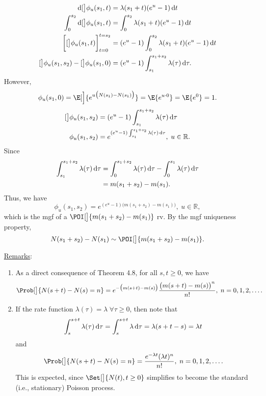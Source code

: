 \begin{Result}
\begin{align*}
        \odif{\ln[\big]{\phi_u(s_1,t)}}                      & =\lambda(s_1+t)(e^u-1)\odif{t}                         \\
        \int_{0}^{s_2}\odif{\ln[\big]{\phi_u(s_1,t)}}        & =\int_{0}^{s_2}\lambda(s_1+t)(e^u-1)\odif{t}           \\
        \biggl[\ln[\big]{\phi_u(s_1,t)}\biggr]_{t=0}^{t=s_2} & =(e^u-1)\int_{0}^{s_2}\lambda(s_1+t)(e^u-1)\odif{t}    \\
        \ln[\big]{\phi_u(s_1,s_2)}-\ln[\big]{\phi_u(s_1,0)}  & =(e^u-1)\int_{s_1}^{s_1+s_2}\lambda(\tau)\odif{\tau}.
    \end{align*}
    However,
    \[ \phi_u(s_1,0)=\E[\Big]{e^{u\bigl(N(s_1)-N(s_1)\bigr)}}=\E{e^{u\cdot 0}}=\E{e^0}=1. \]
    \begin{align*}
        \ln[\big]{\phi_u(s_1,s_2)} & =(e^u-1)\int_{s_1}^{s_1+s_2}\lambda(\tau)\odif{\tau}                        \\
        \phi_u(s_1,s_2)            & =e^{(e^u-1)\int_{s_1}^{s_1+s_2}\lambda(\tau)\odif{\tau}},\; u\in\mathbb{R}.
    \end{align*}
    Since
    \begin{align*}
        \int_{s_1}^{s_1+s_2}\lambda(\tau)\odif{\tau}
         & =\int_{0}^{s_1+s_2}\lambda(\tau)\odif{\tau}-\int_{0}^{s_1}\lambda(\tau)\odif{\tau} \\
         & =m(s_1+s_2)-m(s_1).
    \end{align*}
    Thus, we have
    \[
        \phi_u(s_1,s_2)=e^{(e^u-1)\bigl(m(s_1+s_2)-m(s_1)\bigr)},\; u\in\mathbb{R},
    \]
    which is the mgf of a $ \POI[\big]{m(s_1+s_2)-m(s_1)} $ rv. By the mgf uniqueness property,
    \[  N(s_1+s_2)-N(s_1)\sim \POI[\big]{m(s_1+s_2)-m(s_1)}. \]
\end{Result}
\underline{Remarks}:
\begin{enumerate}[(1)]
    \item As a direct consequence of Theorem 4.8, for all $ s,t\ge 0 $, we have
          \[ \Prob[\big]{N(s+t)-N(s)=n}=e^{-\bigl(m(s+t)-m(s)\bigr)}\frac{\bigl(m(s+t)-m(s)\bigr)^n}{n!},\; n=0,1,2,\ldots. \]
    \item If the rate function $ \lambda(\tau)=\lambda\; \forall \tau\ge 0 $, then note that
          \[ \int_{s}^{s+t}\lambda(\tau)\odif{\tau}=\int_{s}^{s+t}\lambda\odif{\tau}=\lambda(s+t-s)=\lambda t \]
          and
          \[ \Prob[\big]{N(s+t)-N(s)=n}=\frac{e^{-\lambda t}(\lambda t)^n}{n!},\; n=0,1,2,\ldots. \]
          This is expected, since $ \Set[\big]{N(t),t\ge 0} $ simplifies to become the standard (i.e.,
          stationary) Poisson process.
\end{enumerate}
